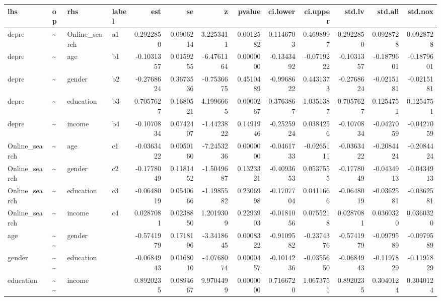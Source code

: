 \documentclass[
]{article}
\begin{document}
\begin{table}[!h]
\centering
\begin{tabular}[t]{llllrrrrrrrrr}
\toprule
lhs & op & rhs & label & est & se & z & pvalue & ci.lower & ci.upper & std.lv & std.all & std.nox\\
\midrule
depre & \textasciitilde{} & Online\_search & a1 & 0.2922850 & 0.0906214 & 3.2253411 & 0.0012582 & 0.1146703 & 0.4698997 & 0.2922850 & 0.0928728 & 0.0928728\\
depre & \textasciitilde{} & age & b1 & -0.1031357 & 0.0159255 & -6.4761164 & 0.0000000 & -0.1343492 & -0.0719222 & -0.1031357 & -0.1879601 & -0.1879601\\
depre & \textasciitilde{} & gender & b2 & -0.2768624 & 0.3673536 & -0.7536675 & 0.4510489 & -0.9968622 & 0.4431373 & -0.2768624 & -0.0215181 & -0.0215181\\
depre & \textasciitilde{} & education & b3 & 0.7057627 & 0.1680521 & 4.1996665 & 0.0000267 & 0.3763867 & 1.0351387 & 0.7057627 & 0.1254751 & 0.1254751\\
depre & \textasciitilde{} & income & b4 & -0.1070834 & 0.0742407 & -1.4423822 & 0.1491946 & -0.2525924 & 0.0384256 & -0.1070834 & -0.0427059 & -0.0427059\\
\addlinespace
Online\_search & \textasciitilde{} & age & c1 & -0.0363422 & 0.0050160 & -7.2453236 & 0.0000000 & -0.0461733 & -0.0265111 & -0.0363422 & -0.2084424 & -0.2084424\\
Online\_search & \textasciitilde{} & gender & c2 & -0.1778049 & 0.1181452 & -1.5049687 & 0.1323321 & -0.4093653 & 0.0537555 & -0.1778049 & -0.0434913 & -0.0434913\\
Online\_search & \textasciitilde{} & education & c3 & -0.0648019 & 0.0540666 & -1.1985582 & 0.2306998 & -0.1707704 & 0.0411666 & -0.0648019 & -0.0362581 & -0.0362581\\
Online\_search & \textasciitilde{} & income & c4 & 0.0287081 & 0.0238850 & 1.2019309 & 0.2293903 & -0.0181056 & 0.0755218 & 0.0287081 & 0.0360320 & 0.0360320\\
age & \textasciitilde{}\textasciitilde{} & gender &  & -0.5741979 & 0.1718196 & -3.3418645 & 0.0008322 & -0.9109582 & -0.2374376 & -0.5741979 & -0.0979589 & -0.0979589\\
\addlinespace
gender & \textasciitilde{}\textasciitilde{} & education &  & -0.0684943 & 0.0168010 & -4.0768074 & 0.0000457 & -0.1014236 & -0.0355650 & -0.0684943 & -0.1197829 & -0.1197829\\
education & \textasciitilde{}\textasciitilde{} & income &  & 0.8920235 & 0.0894667 & 9.9704499 & 0.0000000 & 0.7166720 & 1.0673751 & 0.8920235 & 0.3040124 & 0.3040124\\

\end{tabular}
\end{table}
\end{document}
